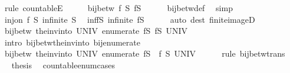 \begin{isabellebody}
\ {\isacharparenleft}rule\ countableE{\isacharparenright}\isanewline
\ \ \isamarkupfalse%
\ \isamarkupfalse%
\ {\isachardoublequoteopen}bij{\isacharunderscore}betw\ f\ S\ {\isacharparenleft}f{\isacharbackquote}S{\isacharparenright}{\isachardoublequoteclose}\isanewline
\ \ \ \ \isamarkupfalse%
\ bij{\isacharunderscore}betw{\isacharunderscore}def\ \isamarkupfalse%
\ simp\isanewline
\ \ \isamarkupfalse%
\isanewline
\ \ \isamarkupfalse%
\ {\isacartoucheopen}inj{\isacharunderscore}on\ f\ S{\isacartoucheclose}\ {\isacartoucheopen}infinite\ S{\isacartoucheclose}\ \isamarkupfalse%
\ inf{\isacharunderscore}fS{\isacharcolon}\ {\isachardoublequoteopen}infinite\ {\isacharparenleft}f{\isacharbackquote}S{\isacharparenright}{\isachardoublequoteclose}\isanewline
\ \ \ \ \isamarkupfalse%
\ {\isacharparenleft}auto\ dest{\isacharcolon}\ finite{\isacharunderscore}imageD{\isacharparenright}\isanewline
\ \ \isamarkupfalse%
\ \isamarkupfalse%
\ {\isachardoublequoteopen}bij{\isacharunderscore}betw\ {\isacharparenleft}the{\isacharunderscore}inv{\isacharunderscore}into\ UNIV\ {\isacharparenleft}enumerate\ {\isacharparenleft}f{\isacharbackquote}S{\isacharparenright}{\isacharparenright}{\isacharparenright}\ {\isacharparenleft}f{\isacharbackquote}S{\isacharparenright}\ UNIV{\isachardoublequoteclose}\isanewline
\ \ \ \ \isamarkupfalse%
\ {\isacharparenleft}intro\ bij{\isacharunderscore}betw{\isacharunderscore}the{\isacharunderscore}inv{\isacharunderscore}into\ bij{\isacharunderscore}enumerate{\isacharparenright}\isanewline
\ \ \isamarkupfalse%
\ \isamarkupfalse%
\ {\isachardoublequoteopen}bij{\isacharunderscore}betw\ {\isacharparenleft}the{\isacharunderscore}inv{\isacharunderscore}into\ UNIV\ {\isacharparenleft}enumerate\ {\isacharparenleft}f{\isacharbackquote}S{\isacharparenright}{\isacharparenright}\ {\isasymcirc}\ f{\isacharparenright}\ S\ UNIV{\isachardoublequoteclose}\isanewline
\ \ \ \ \isamarkupfalse%
\ {\isacharparenleft}rule\ bij{\isacharunderscore}betw{\isacharunderscore}trans{\isacharparenright}\isanewline
\ \ \isamarkupfalse%
\ \isamarkupfalse%
\ thesis\ \isacommand{{\isachardot}{\isachardot}}\isamarkupfalse%
\isanewline
{}\isamarkupfalse%
%
\endisatagproof
{\isafoldproof}%
%
\isadelimproof
\isanewline
%
\endisadelimproof
\isanewline
{}\isamarkupfalse%
\ countable{\isacharunderscore}enum{\isacharunderscore}cases{\isacharcolon}\isanewline

\end{isabellebody}
